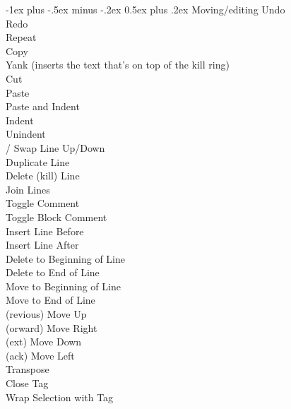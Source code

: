 \documentclass[10pt,landscape]{article}
\makeatletter
\renewcommand{\section}{\@startsection{section}{1}{0mm}%
                                {-1ex plus -.5ex minus -.2ex}%
                                {0.5ex plus .2ex}%
                                {\normalfont\large\bfseries}}
\makeatother
\begin{document}
\begin{multicols}{3}
\section{Moving/editing}
\keys{\cmd}  Undo \\
\keys{\cmd} \keys{\shift}  Redo \\
\keys{\cmd}  Repeat \\
\keys{\cmd}  Copy \\
\keys{\ctrl}  Yank (inserts the text that's on top of the kill ring)\\
\keys{\cmd}  Cut \\
\keys{\cmd}  Paste \\
\keys{\cmd} \keys{\shift}  Paste and Indent \\
\keys{\cmd} \keys{]} Indent \\
\keys{\cmd} \keys{[} Unindent \\
\keys{\cmd} \keys{\ctrl} \keys{\arrowkeyup}/\keys{\arrowkeydown} Swap Line Up/Down \\
\keys{\cmd} \keys{\shift}  Duplicate Line \\
\keys{\ctrl} \keys{\shift}  Delete (kill) Line \\
\keys{\cmd}  Join Lines \\
\keys{\cmd} \keys{/} Toggle Comment \\
\keys{\cmd} \keys{\Alt} \keys{/} Toggle Block Comment \\
\keys{\cmd} \keys{\shift} \keys{\return} Insert Line Before \\
\keys{\cmd} \keys{\return} Insert Line After \\
\keys{\cmd} \keys{\backspace} Delete to Beginning of Line \\
\keys{\ctrl}  Delete to End of Line \\
\keys{\ctrl}  Move to Beginning of Line \\
\keys{\ctrl}  Move to End of Line \\
\keys{\ctrl} (revious) Move Up \\
\keys{\ctrl} (orward) Move Right \\
\keys{\ctrl} (ext) Move Down \\
\keys{\ctrl} (ack) Move Left \\
\keys{\ctrl}  Transpose \\
\keys{\cmd} \keys{\Alt}  Close Tag \\
\keys{\ctrl} \keys{\shift}  Wrap Selection with Tag \\

\end{multicols}
\end{document}
